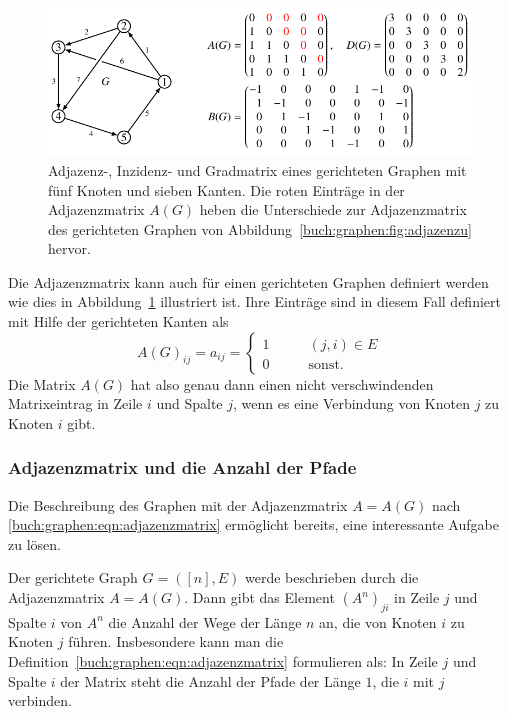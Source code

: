 \begin{figure}
\centering
\includegraphics{chapters/70-graphen/images/adjazenzd.pdf}
\caption{Adjazenz-, Inzidenz- und Gradmatrix eines gerichteten
Graphen mit fünf Knoten und sieben Kanten.
Die roten Einträge in der Adjazenzmatrix $A(G)$ heben die
Unterschiede zur Adjazenzmatrix des gerichteten Graphen
von Abbildung~\ref{buch:graphen:fig:adjazenzu} hervor.
\label{buch:graphen:fig:adjazenzd}}
\end{figure}
Die Adjazenzmatrix kann auch für einen gerichteten Graphen definiert
werden wie dies in Abbildung~\ref{buch:graphen:fig:adjazenzd}
illustriert ist.
Ihre Einträge sind in diesem Fall definiert mit Hilfe der 
gerichteten Kanten als
\begin{equation}
A(G)_{i\!j}
=
a_{i\!j}
=
\begin{cases}
1&\qquad  (j,i) \in E\\
0&\qquad  \text{sonst.}
\end{cases}
\label{buch:graphen:eqn:adjazenzmatrixgerichtet}
\end{equation}
Die Matrix $A(G)$ hat also genau dann einen nicht verschwindenden
Matrixeintrag in Zeile $i$ und Spalte $j$, wenn es eine Verbindung
von Knoten $j$ zu Knoten $i$ gibt.

\subsubsection{Adjazenzmatrix und die Anzahl der Pfade}
Die Beschreibung des Graphen mit der Adjazenzmatrix $A=A(G)$ nach
\eqref{buch:graphen:eqn:adjazenzmatrix} ermöglicht bereits, eine
interessante Aufgabe zu lösen.

\begin{satz}
\label{buch:graphen:pfade-der-laenge-n}
Der gerichtete Graph $G=([n],E)$ werde beschrieben durch die Adjazenzmatrix
$A=A(G)$.
Dann gibt das Element $(A^n)_{ji}$ in Zeile $j$ und Spalte $i$ von $A^n$
die Anzahl der Wege der Länge $n$ an, die von Knoten $i$ zu Knoten $j$ führen.
Insbesondere kann man die Definition~\eqref{buch:graphen:eqn:adjazenzmatrix}
formulieren als: In Zeile $j$ und Spalte $i$ der Matrix steht die Anzahl
der Pfade der Länge $1$, die $i$ mit $j$ verbinden.
\end{satz}
%

